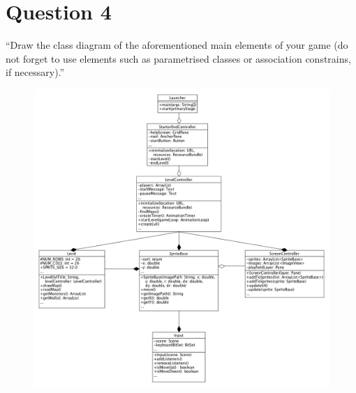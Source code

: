 \section{Question 4}

``Draw the class diagram of the aforementioned main elements of your game (do not forget to use elements such as parametrised classes or association constrains, if necessary).''

\begin{figure}[h]
\includegraphics[width=\textwidth]{classDiagramsMain}
\end{figure}